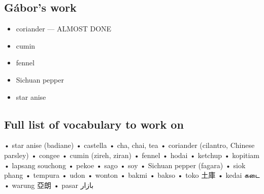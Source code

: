 \documentclass[12pt]{article}
\begin{document}
\subsection{Gábor's work}
\begin{itemize}
    \item coriander --- ALMOST DONE
    \item cumin
    \item fennel
    \item Sichuan pepper
    \item star anise
\end{itemize}

\subsection{Full list of vocabulary to work on}
•	star anise (badiane)
•	castella
•	cha, chai, tea
•	coriander (cilantro, Chinese parsley)  
•	congee
•	cumin (zireh, ziran) 
•	fennel
•	hodai
•	ketchup
•	kopitiam
•	lapsang souchong
•	pekoe
•	sago
•	soy
•	Sichuan pepper (fagara)
•	siok phang
•	tempura
•	udon
•	wonton
•	bakmi
•	bakso
•	toko 土庫
•	kedai கடை
•	warung 亞朗
•	pasar بازار









\printbibliography
\end{document}
